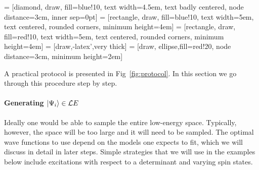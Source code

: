  = [diamond, draw, fill=blue!10, 
    text width=4.5em, text badly centered, node distance=3cm, inner sep=0pt]
 = [rectangle, draw, fill=blue!10, 
    text width=5em, text centered, rounded corners, minimum height=4em]
 = [rectangle, draw, fill=red!10, 
    text width=5em, text centered, rounded corners, minimum height=4em]
 = [draw,-latex',very thick]
 = [draw, ellipse,fill=red!20, node distance=3cm,
    minimum height=2em]
\begin{figure*}
\caption{A practical protocol for fitting effective models to {\it ab initio} data.}
\label{fig:protocol} 
\end{figure*}

A practical protocol is presented in Fig~\ref{fig:protocol}. 
In this section we go through this procedure step by step.

\paragraph{Generating $\ket{\Psi_i}\in {\mathcal LE}$}
Ideally one would be able to sample the entire low-energy space. 
Typically, however, the space will be too large and it will need to be sampled. 
The optimal wave functions to use depend on the models one expects to fit, which we will discuss in detail  in later steps. 
Simple strategies that we will use in the examples below include excitations with respect to a determinant and varying spin states.


